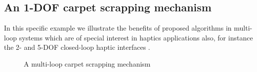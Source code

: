 {\subsection{An 1-DOF carpet scrapping mechanism}
\label{c5carpetscrapping}
In this specific example we illustrate the benefits of proposed algorithms in multi-loop systems which are of special interest in haptics applications also, for instance the 2- and 5-DOF closed-loop haptic interfaces \citep{stocco2001optimal}.
 \begin{figure}[h!]
 	\begin{center}
 	\end{center}
 	\caption{A multi-loop carpet scrapping mechanism \citep{chaudhary2008dynamics}}
 	\label{fig:c5cs_mechanism}
 \end{figure} 
 
}
